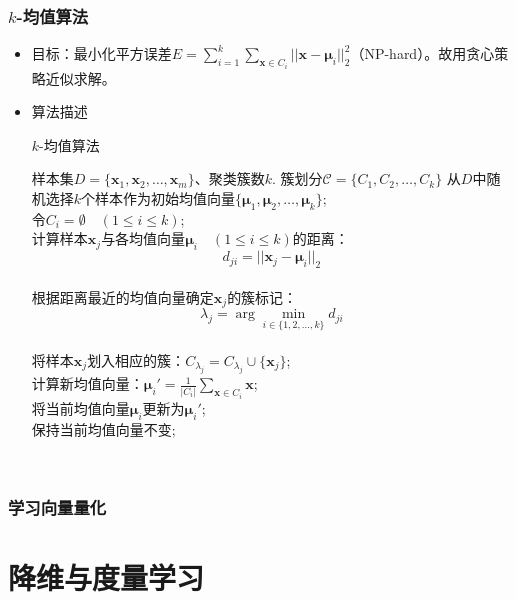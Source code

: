 \documentclass{ctexart}
\begin{document}
					\subsubsection{$k$-均值算法}
						\begin{itemize}
							\item 目标：最小化平方误差$E=\sum_{i=1}^{k}\sum_{\bm{x}\in C_i}^{}||\bm{x}-\bm{\mu}_i||_2^2$（NP-hard）。故用贪心策略近似求解。
							\item 算法描述\begin{algorithm}
								\caption{$k$-均值算法}
								\begin{algorithmic}[1]
									\REQUIRE 样本集$D=\{\bm{x}_1,\bm{x}_2,\dots,\bm{x}_m\}$、聚类簇数$k$.
									\ENSURE 簇划分$\mathcal{C}=\{C_1,C_2,\dots,C_k\}$
									\STATE 从$D$中随机选择$k$个样本作为初始均值向量$\{\bm{\mu}_1,\bm{\mu}_2,\dots,\bm{\mu}_k\}$; \\
									\REPEAT
									\STATE 令$C_i=\emptyset\quad(1\le i\le k)$; \\
										\STATE 计算样本$\bm{x}_j$与各均值向量$\bm{\mu}_i\quad(1\le i\le k)$的距离：\[d_{ji}=||\bm{x}_j-\bm{\mu}_i||_2\] \\
										\STATE 根据距离最近的均值向量确定$\bm{x}_j$的簇标记：\[\lambda_j=\arg\min_{i\in\{1,2,\dots,k\}}d_{ji}\] \\
										\STATE 将样本$\bm{x}_j$划入相应的簇：$C_{\lambda_j}=C_{\lambda_j}\cup\{\bm{x}_j\}$; \\
									\ENDFOR
										\STATE 计算新均值向量：$\bm{\mu}_i'=\frac{1}{|C_i|}\sum_{\bm{x}\in C_i}^{}\bm{x}$; \\
											\STATE 将当前均值向量$\bm{\mu}_i$更新为$\bm{\mu}_i'$; \\
										\ELSE
											\STATE 保持当前均值向量不变; \\
										\ENDIF
									\ENDFOR
								\end{algorithmic} 
							\end{algorithm}
						\end{itemize}
					\subsubsection{学习向量量化}
			\section{降维与度量学习}
\end{document}
